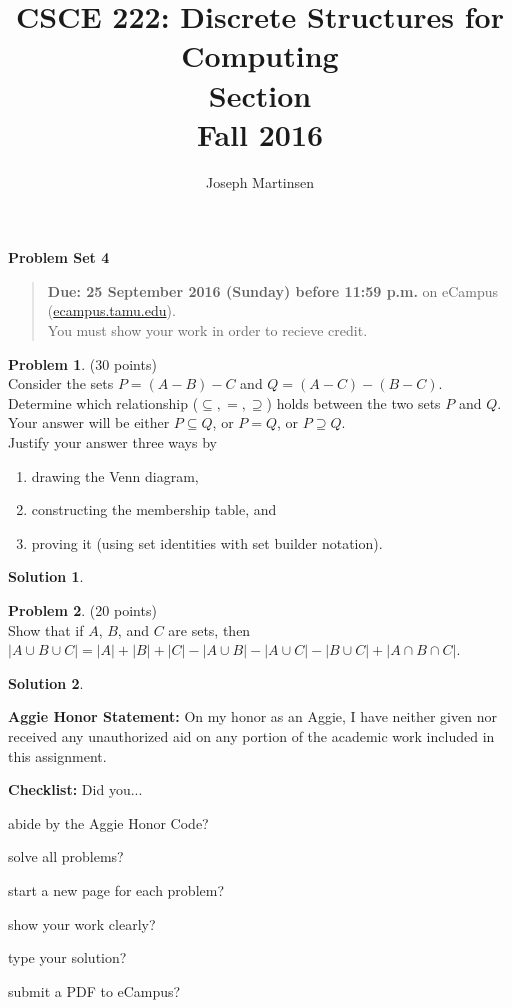 \documentclass{article}
\title{CSCE 222: Discrete Structures for Computing\\Section \mysectionnumber\\Fall 2016}
\author{Joseph Martinsen}
\theoremstyle{definition}
\newtheorem{problem}{Problem}
\newtheorem*{solution}{Solution}
\newcommand{\honor}{\noindent \textbf{Aggie Honor Statement: }On my honor as an Aggie, I have neither
  given nor received any unauthorized aid on any portion of the academic work included in this assignment.
}
\newcommand{\checklist}{\noindent\textbf{Checklist:}
Did you...
\begin{compactenum}
\item abide by the Aggie Honor Code?
\item solve all problems?
\item start a new page for each problem?
\item show your work clearly?
\item type your solution?
\item submit a PDF to eCampus?
\end{compactenum}
}
\newcommand{\problemset}[1]{\begin{center}\textbf{Problem Set #1}\end{center}}
\newcommand{\duedate}[1]{\begin{quote}\textbf{Due: #1} on eCampus (\url{ecampus.tamu.edu}). \\You must show your work in order to recieve credit.\end{quote}}
\begin{document}
\maketitle

\problemset{4}

\duedate{25 September 2016 (Sunday) before 11:59 p.m.}

\bigskip

\begin{problem} (30 points)\\
Consider the sets $P = (A-B)-C$ and $Q = (A-C) - (B-C)$.\\
Determine which relationship ($\subseteq,=,\supseteq$) holds between the two sets $P$ and $Q$.\\
Your answer will be either $P \subseteq Q$, or $P = Q$, or $P \supseteq Q$.\\
Justify your answer three ways by
\begin{enumerate}
\item drawing the Venn diagram,
\item constructing the membership table, and
\item proving it (using set identities with set builder notation).
\end{enumerate}
\end{problem}

\begin{solution}\ \\


\end{solution}

\newpage

\begin{problem} (20 points)\\
Show that if $A$, $B$, and $C$ are sets, then $|A \cup B \cup C| = |A| + |B| + |C| - |A \cup B| - |A \cup C| - |B \cup C| + |A \cap B \cap C|$.
\end{problem}

\begin{solution}\ \\


\end{solution}

\newpage

\bigskip
\honor

\bigskip
\checklist
\end{document}
